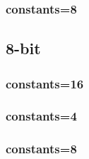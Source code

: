 \documentclass{article}
\begin{document}
\subsubsection*{constants=8}
\begin{figure}[H]
\centering
\resizebox{0.95\linewidth}{!}{}
\end{figure}
\subsection*{8-bit}
\subsubsection*{constants=16}
\begin{figure}[H]
\centering
\resizebox{0.95\linewidth}{!}{}
\end{figure}
\subsubsection*{constants=4}
\begin{figure}[H]
\centering
\resizebox{0.95\linewidth}{!}{}
\end{figure}
\subsubsection*{constants=8}
\begin{figure}[H]
\centering
\resizebox{0.95\linewidth}{!}{}
\end{figure}
\end{document}
